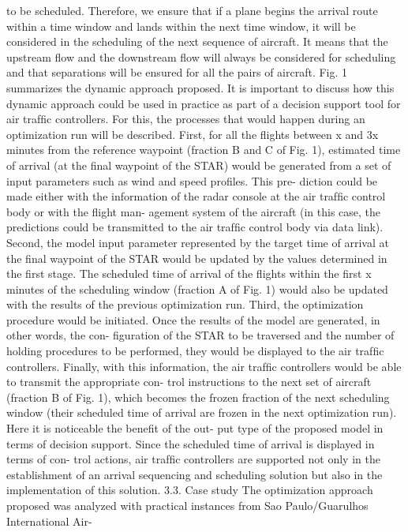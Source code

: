 \documentclass{aer1315-pretty}
\begin{document}
\begin{itemize}
to be scheduled. Therefore, we ensure that if a plane begins the arrival route within a time window and lands within the next
time window, it will be considered in the scheduling of the next sequence of aircraft. It means that the upstream ﬂow and the
downstream ﬂow will always be considered for scheduling and that separations will be ensured for all the pairs of aircraft.
Fig. 1 summarizes the dynamic approach proposed.
    It is important to discuss how this dynamic approach could be used in practice as part of a decision support tool for air
trafﬁc controllers. For this, the processes that would happen during an optimization run will be described. First, for all the
ﬂights between x and 3x minutes from the reference waypoint (fraction B and C of Fig. 1), estimated time of arrival (at the
ﬁnal waypoint of the STAR) would be generated from a set of input parameters such as wind and speed proﬁles. This pre-
diction could be made either with the information of the radar console at the air trafﬁc control body or with the ﬂight man-
agement system of the aircraft (in this case, the predictions could be transmitted to the air trafﬁc control body via data link).
Second, the model input parameter represented by the target time of arrival at the ﬁnal waypoint of the STAR would be
updated by the values determined in the ﬁrst stage. The scheduled time of arrival of the ﬂights within the ﬁrst x minutes
of the scheduling window (fraction A of Fig. 1) would also be updated with the results of the previous optimization run.
Third, the optimization procedure would be initiated. Once the results of the model are generated, in other words, the con-
ﬁguration of the STAR to be traversed and the number of holding procedures to be performed, they would be displayed to the
air trafﬁc controllers. Finally, with this information, the air trafﬁc controllers would be able to transmit the appropriate con-
trol instructions to the next set of aircraft (fraction B of Fig. 1), which becomes the frozen fraction of the next scheduling
window (their scheduled time of arrival are frozen in the next optimization run). Here it is noticeable the beneﬁt of the out-
put type of the proposed model in terms of decision support. Since the scheduled time of arrival is displayed in terms of con-
trol actions, air trafﬁc controllers are supported not only in the establishment of an arrival sequencing and scheduling
solution but also in the implementation of this solution.
3.3. Case study
    The optimization approach proposed was analyzed with practical instances from Sao Paulo/Guarulhos International Air-

\end{itemize}
\end{document}
